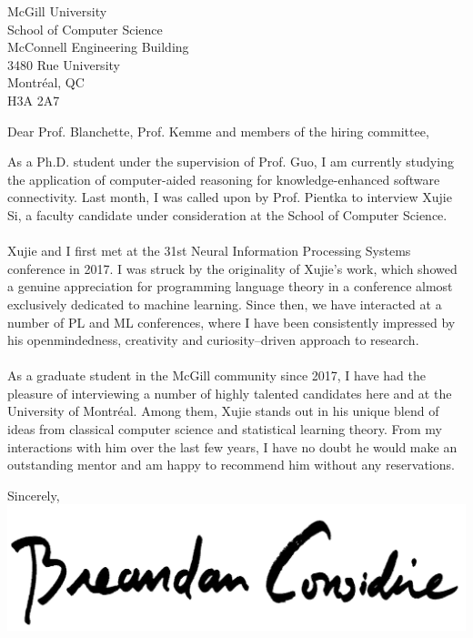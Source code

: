 \documentclass{letter}
\begin{document}
    \begin{letter}{McGill University\\School of Computer Science\\McConnell Engineering Building\\3480 Rue University\\Montr\'eal, QC\\H3A 2A7}
        \opening{Dear Prof. Blanchette, Prof. Kemme and members of the hiring committee,}
        As a Ph.D. student under the supervision of Prof. Guo, I am currently studying the application of computer-aided reasoning for knowledge-enhanced software connectivity. Last month, I was called upon by Prof. Pientka to interview Xujie Si, a faculty candidate under consideration at the School of Computer Science.\\\\
        Xujie and I first met at the 31st Neural Information Processing Systems conference in 2017. I was struck by the originality of Xujie's work, which showed a genuine appreciation for programming language theory in a conference almost exclusively dedicated to machine learning. Since then, we have interacted at a number of PL and ML conferences, where I have been consistently impressed by his openmindedness, creativity and curiosity--driven approach to research.\\\\
        As a graduate student in the McGill community since 2017, I have had the pleasure of interviewing a number of highly talented candidates here and at the University of Montr\'eal. Among them, Xujie stands out in his unique blend of ideas from classical computer science and statistical learning theory. From my interactions with him over the last few years, I have no doubt he would make an outstanding mentor and am happy to recommend him without any reservations.\\
        \closing{Sincerely,\\
            \includegraphics[scale=0.06]{signature.png}\\
        }
    \end{letter}
\end{document}
